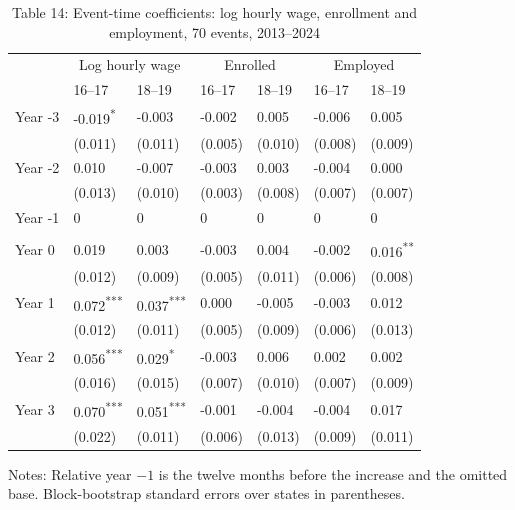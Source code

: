 \documentclass[12pt]{article}
\begin{document}
\begin{table}
\centering
\caption{Table 14: Event-time coefficients: log hourly wage, enrollment and employment, 70 events, 2013--2024}

\small
\begin{tabular}{p{}p{}p{}p{}p{}p{}p{}}
\toprule
 & \multicolumn{2}{c}{Log hourly wage} & \multicolumn{2}{c}{Enrolled} & \multicolumn{2}{c}{Employed} \\

 & 16--17 & 18--19 & 16--17 & 18--19 & 16--17 & 18--19 \\
\midrule
Year -3 & -0.019\textsuperscript{*} & -0.003 & -0.002 & 0.005 & -0.006 & 0.005 \\
 & (0.011) & (0.011) & (0.005) & (0.010) & (0.008) & (0.009) \\
Year -2 & 0.010 & -0.007 & -0.003 & 0.003 & -0.004 & 0.000 \\
 & (0.013) & (0.010) & (0.003) & (0.008) & (0.007) & (0.007) \\
Year -1 & 0 & 0 & 0 & 0 & 0 & 0 \\
 &  &  &  &  &  &  \\
Year 0 & 0.019 & 0.003 & -0.003 & 0.004 & -0.002 & 0.016\textsuperscript{**} \\
 & (0.012) & (0.009) & (0.005) & (0.011) & (0.006) & (0.008) \\
Year 1 & 0.072\textsuperscript{***} & 0.037\textsuperscript{***} & 0.000 & -0.005 & -0.003 & 0.012 \\
 & (0.012) & (0.011) & (0.005) & (0.009) & (0.006) & (0.013) \\
Year 2 & 0.056\textsuperscript{***} & 0.029\textsuperscript{*} & -0.003 & 0.006 & 0.002 & 0.002 \\
 & (0.016) & (0.015) & (0.007) & (0.010) & (0.007) & (0.009) \\
Year 3 & 0.070\textsuperscript{***} & 0.051\textsuperscript{***} & -0.001 & -0.004 & -0.004 & 0.017 \\
 & (0.022) & (0.011) & (0.006) & (0.013) & (0.009) & (0.011) \\
\bottomrule
\end{tabular}



\noindent\small Notes: Relative year $-1$ is the twelve months before the increase and the omitted base. Block-bootstrap standard errors over states in parentheses.

\end{table}
\end{document}
